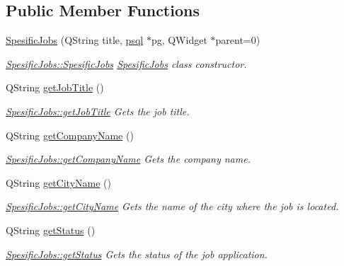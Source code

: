 \subsection*{Public Member Functions}
\begin{DoxyCompactItemize}
\item 
\mbox{\hyperlink{class_spesific_jobs_a382c130bb70f2bf25c76ef5c720659d6}{Spesific\+Jobs}} (Q\+String title, \mbox{\hyperlink{classpsql}{psql}} $\ast$pg, Q\+Widget $\ast$parent=0)
\begin{DoxyCompactList}\small\item\em \mbox{\hyperlink{class_spesific_jobs_a382c130bb70f2bf25c76ef5c720659d6}{Spesific\+Jobs\+::\+Spesific\+Jobs}} \mbox{\hyperlink{class_spesific_jobs}{Spesific\+Jobs}} class constructor. \end{DoxyCompactList}\item 
Q\+String \mbox{\hyperlink{class_spesific_jobs_afe77ad902d3e9f3cfd5f057e0a37a193}{get\+Job\+Title}} ()
\begin{DoxyCompactList}\small\item\em \mbox{\hyperlink{class_spesific_jobs_afe77ad902d3e9f3cfd5f057e0a37a193}{Spesific\+Jobs\+::get\+Job\+Title}} Gets the job title. \end{DoxyCompactList}\item 
Q\+String \mbox{\hyperlink{class_spesific_jobs_a51afafde9872e78e8b09e3bc00a2a161}{get\+Company\+Name}} ()
\begin{DoxyCompactList}\small\item\em \mbox{\hyperlink{class_spesific_jobs_a51afafde9872e78e8b09e3bc00a2a161}{Spesific\+Jobs\+::get\+Company\+Name}} Gets the company name. \end{DoxyCompactList}\item 
Q\+String \mbox{\hyperlink{class_spesific_jobs_a39390d9c54635a2dc60c80322a7b42ed}{get\+City\+Name}} ()
\begin{DoxyCompactList}\small\item\em \mbox{\hyperlink{class_spesific_jobs_a39390d9c54635a2dc60c80322a7b42ed}{Spesific\+Jobs\+::get\+City\+Name}} Gets the name of the city where the job is located. \end{DoxyCompactList}\item 
Q\+String \mbox{\hyperlink{class_spesific_jobs_aefe905d920961199fec0aff37a34b50d}{get\+Status}} ()
\begin{DoxyCompactList}\small\item\em \mbox{\hyperlink{class_spesific_jobs_aefe905d920961199fec0aff37a34b50d}{Spesific\+Jobs\+::get\+Status}} Gets the status of the job application. \end{DoxyCompactList}\item 

\end{DoxyCompactItemize}
